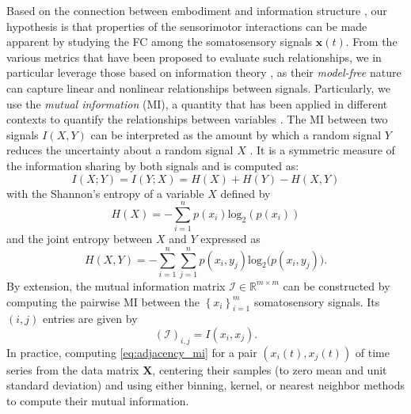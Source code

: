 Based on the connection between embodiment and information structure \cite{Pfeifer2007Selforganizationembodiment}, our hypothesis is that properties of the sensorimotor interactions can be made apparent by studying the FC among the somatosensory signals $ \bm{x}(t) $. From the various metrics that have been proposed to evaluate such relationships, we in particular leverage those based on information theory \cite{Bonsignorio2020EntropyBasedMetrics,Bonsignorio2013Quantifyingevolutionaryself}, as their \emph{model-free} nature can capture linear and nonlinear relationships between signals. Particularly, we use the \emph{mutual information} (MI), a quantity that has been applied in different contexts to quantify the relationships between variables \cite{Steuer2002mutualinformationdetecting}. The MI between two signals $ I\left(X,Y\right) $ can be interpreted as the amount by which a random signal $ Y $ reduces the uncertainty about a random signal $ X $ \cite{Cover1999Elementsinformationtheory}. It is a symmetric measure of the information sharing by both signals and is computed as:
\begin{equation}\label{eq:mutual_information}
	I\left(X;Y\right) =I\left(Y;X\right) = H(X) + H(Y) - H(X,Y)
\end{equation}
with the Shannon's entropy of a variable $X$ defined by 
\begin{equation}\label{eq:entropy}
	H(X) = -\sum_{i=1}^{n}p(x_i)\text{log}_2\left(p\left(x_i\right)\right)
\end{equation}
and the joint entropy between $ X $ and $ Y $ expressed as
\begin{equation}\label{eq:joint_entropy}
	H(X,Y) = -\sum_{i=1}^{n}\sum_{j=1}^{n} p(x_i,y_j)\text{log}_2\big(p\left(x_i,y_j\right)\big).
\end{equation}
By extension, the mutual information matrix $\bm{\mathcal{I}} \in \mathbb{R}^{m \times m}$ can be constructed by computing the pairwise MI between the $\left\lbrace x_i\right\rbrace^m_{i=1}$ somatosensory signals. Its $(i,j)$ entries are given by
\begin{equation}\label{eq:adjacency_mi}
	(\bm{\mathcal{I}})_{i,j} = I(x_i,x_j).
\end{equation}
In practice, computing \eqref{eq:adjacency_mi}  for a pair $\left({x}_i(t),{x}_j(t)\right)$ of time series from the data matrix $\bm{X}$, centering their samples (to zero mean and unit standard deviation) and using either binning, kernel, or nearest neighbor methods \cite{WaltersWilliams2009Estimationmutualinformation} to compute their mutual information. 

